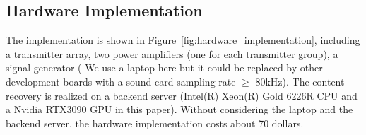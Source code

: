 \subsection{Hardware Implementation}
The implementation is shown in Figure~\ref{fig:hardware_implementation}, including a transmitter array, two power amplifiers (one for each transmitter group), a signal generator ( We use a laptop here but it could be replaced by other development boards with a sound card sampling rate $\geq$ 80kHz). The content recovery is realized on a backend server (Intel(R) Xeon(R) Gold 6226R CPU and a Nvidia RTX3090 GPU in this paper). Without considering the laptop and the backend server, the hardware implementation costs about 70 dollars. 